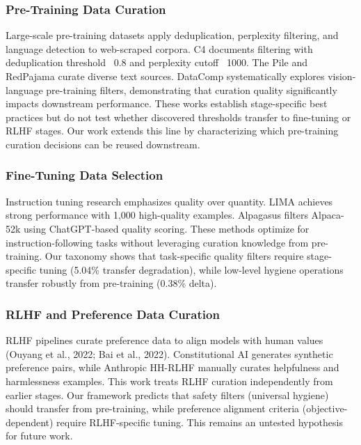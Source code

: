 
\subsubsection{Pre-Training Data Curation}

Large-scale pre-training datasets apply deduplication, perplexity filtering, and language detection to web-scraped corpora. C4 \citep{Raffel2020Exploring} documents filtering with deduplication threshold ~0.8 and perplexity cutoff ~1000. The Pile \citep{Gao2020ThePile} and RedPajama curate diverse text sources. DataComp \citep{Gadre2023DataComp} systematically explores vision-language pre-training filters, demonstrating that curation quality significantly impacts downstream performance. These works establish stage-specific best practices but do not test whether discovered thresholds transfer to fine-tuning or RLHF stages. Our work extends this line by characterizing which pre-training curation decisions can be reused downstream.

\subsubsection{Fine-Tuning Data Selection}

Instruction tuning research emphasizes quality over quantity. LIMA \citep{Zhou2023LIMA} achieves strong performance with 1,000 high-quality examples. Alpagasus \citep{Chen2023Alpagasus} filters Alpaca-52k using ChatGPT-based quality scoring. These methods optimize for instruction-following tasks without leveraging curation knowledge from pre-training. Our taxonomy shows that task-specific quality filters require stage-specific tuning (5.04\% transfer degradation), while low-level hygiene operations transfer robustly from pre-training (0.38\% delta).

\subsubsection{RLHF and Preference Data Curation}

RLHF pipelines curate preference data to align models with human values (Ouyang et al., 2022; Bai et al., 2022). Constitutional AI \citep{Bai2022Constitutional} generates synthetic preference pairs, while Anthropic HH-RLHF manually curates helpfulness and harmlessness examples. This work treats RLHF curation independently from earlier stages. Our framework predicts that safety filters (universal hygiene) should transfer from pre-training, while preference alignment criteria (objective-dependent) require RLHF-specific tuning. This remains an untested hypothesis for future work.

